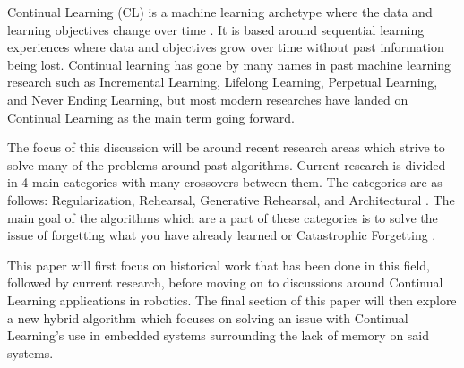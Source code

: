 
\indent Continual Learning (CL) is a machine learning archetype where the data and learning objectives change over time \cite{DBLP:journals/corr/abs-1907-00182}. It is based around sequential learning experiences where data and objectives grow over time without past information being lost. Continual learning has gone by many names in past machine learning research such as Incremental Learning, Lifelong Learning, Perpetual Learning, and Never Ending Learning, but most modern researches have landed on Continual Learning as the main term going forward. 

\indent The focus of this discussion will be around recent research areas which strive to solve many of the problems around past algorithms. Current research is divided in 4 main categories with many crossovers between them. The categories are as follows: Regularization, Rehearsal, Generative Rehearsal, and Architectural \cite{DBLP:journals/corr/abs-1907-00182}. The main goal of the algorithms which are a part of these categories is to solve the issue of forgetting what you have already learned or Catastrophic Forgetting \cite{MCCLOSKEY1989109}. 

\indent This paper will first focus on historical work that has been done in this field, followed by current research, before moving on to discussions around Continual Learning applications in robotics. The final section of this paper will then explore a new hybrid algorithm which focuses on solving an issue with Continual Learning's use in embedded systems surrounding the lack of memory on said systems.

